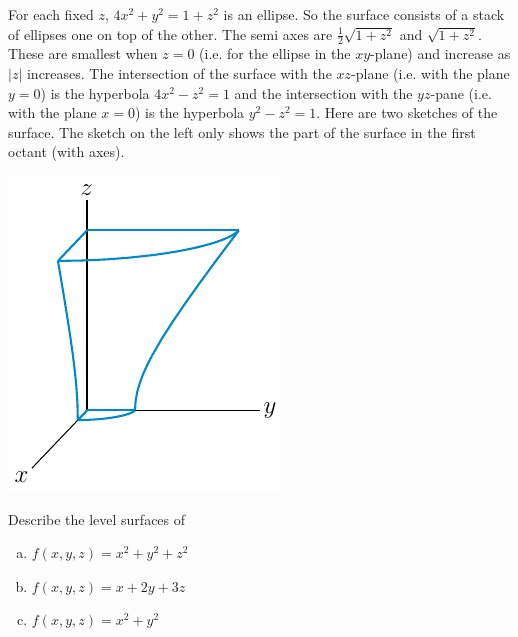 \begin{solution} 
For each fixed $z$, $4x^2+y^2=1+z^2$ is an ellipse. So the surface 
consists of a stack of ellipses one on top of the other. The semi axes are
$\frac{1}{2}\sqrt{1+z^2}$ and $\sqrt{1+z^2}$. These are smallest when $z=0$
(i.e. for the ellipse in the $xy$-plane) and increase as $|z|$ increases.
The intersection of the surface with the $xz$-plane (i.e. with the plane $y=0$) is the hyperbola $4x^2-z^2=1$ and the intersection with
the $yz$-pane (i.e. with the plane $x=0$) is the hyperbola $y^2-z^2=1$. 
Here are two sketches of the surface. The sketch on the left only shows 
the part of the surface in the first octant  (with axes).
\begin{center}
   \includegraphics{fig/OE226_09A_l.pdf}\qquad\qquad
\end{center}

\end{solution}

\begin{question}
Describe the level surfaces of
\begin{enumerate}[(a)]
\item $f(x,y,z)=x^2+y^2+z^2$
\item $f(x,y,z)=x+2y+3z$
\item $f(x,y,z)=x^2+y^2$
\end{enumerate}
\end{question}

